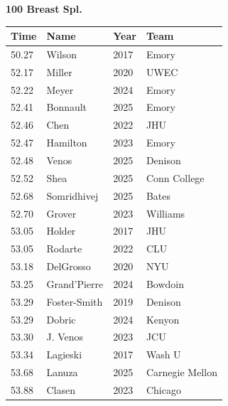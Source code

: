 \noindent\begin{minipage}[t]{0.98\textwidth}
\centering
\textbf{\textcolor{teamprimary}{100 Breast Spl.}}\par
\vspace{0.5em}
\centering
\small
\renewcommand{\arraystretch}{1.0}
\setlength{\tabcolsep}{4pt}
\begin{tabular}{@{}p{2.5cm}p{4.5cm}p{1.5cm}p{2.5cm}@{}}
\toprule
\textbf{Time} & \textbf{Name} & \textbf{Year} & \textbf{Team} \\
\midrule
50.27 & Wilson & 2017 & Emory \\
52.17 & Miller & 2020 & UWEC \\
52.22 & Meyer & 2024 & Emory \\
52.41 & Bonnault & 2025 & Emory \\
52.46 & Chen & 2022 & JHU \\
52.47 & Hamilton & 2023 & Emory \\
52.48 & Venos & 2025 & Denison \\
52.52 & Shea & 2025 & Conn College \\
52.68 & Somridhivej & 2025 & Bates \\
52.70 & Grover & 2023 & Williams \\
53.05 & Holder & 2017 & JHU \\
53.05 & Rodarte & 2022 & CLU \\
53.18 & DelGrosso & 2020 & NYU \\
53.25 & Grand'Pierre & 2024 & Bowdoin \\
53.29 & Foster-Smith & 2019 & Denison \\
53.29 & Dobric & 2024 & Kenyon \\
53.30 & J. Venos & 2023 & JCU \\
53.34 & Lagieski & 2017 & Wash U \\
53.68 & Lanuza & 2025 & Carnegie Mellon \\
53.88 & Clasen & 2023 & Chicago \\
\bottomrule
\end{tabular}
\end{minipage}
\vspace{1.2em}
